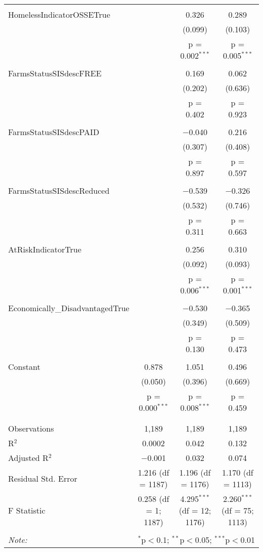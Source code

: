 \begin{table}[!htbp]
\begin{tabular}{@{\extracolsep{5pt}}lccc}
  & & & \\ 
 HomelessIndicatorOSSETrue &  & 0.326 & 0.289 \\ 
  &  & (0.099) & (0.103) \\ 
  &  & p = 0.002$^{***}$ & p = 0.005$^{***}$ \\ 
  & & & \\ 
 FarmsStatusSISdescFREE &  & 0.169 & 0.062 \\ 
  &  & (0.202) & (0.636) \\ 
  &  & p = 0.402 & p = 0.923 \\ 
  & & & \\ 
 FarmsStatusSISdescPAID &  & $-$0.040 & 0.216 \\ 
  &  & (0.307) & (0.408) \\ 
  &  & p = 0.897 & p = 0.597 \\ 
  & & & \\ 
 FarmsStatusSISdescReduced &  & $-$0.539 & $-$0.326 \\ 
  &  & (0.532) & (0.746) \\ 
  &  & p = 0.311 & p = 0.663 \\ 
  & & & \\ 
 AtRiskIndicatorTrue &  & 0.256 & 0.310 \\ 
  &  & (0.092) & (0.093) \\ 
  &  & p = 0.006$^{***}$ & p = 0.001$^{***}$ \\ 
  & & & \\ 
 Economically\_DisadvantagedTrue &  & $-$0.530 & $-$0.365 \\ 
  &  & (0.349) & (0.509) \\ 
  &  & p = 0.130 & p = 0.473 \\ 
  & & & \\ 
 Constant & 0.878 & 1.051 & 0.496 \\ 
  & (0.050) & (0.396) & (0.669) \\ 
  & p = 0.000$^{***}$ & p = 0.008$^{***}$ & p = 0.459 \\ 
  & & & \\ 
\hline \\[-1.8ex] 
Observations & 1,189 & 1,189 & 1,189 \\ 
R$^{2}$ & 0.0002 & 0.042 & 0.132 \\ 
Adjusted R$^{2}$ & $-$0.001 & 0.032 & 0.074 \\ 
Residual Std. Error & 1.216 (df = 1187) & 1.196 (df = 1176) & 1.170 (df = 1113) \\ 
F Statistic & 0.258 (df = 1; 1187) & 4.295$^{***}$ (df = 12; 1176) & 2.260$^{***}$ (df = 75; 1113) \\ 
\hline 
\hline \\[-1.8ex] 
\textit{Note:}  & \multicolumn{3}{r}{$^{*}$p$<$0.1; $^{**}$p$<$0.05; $^{***}$p$<$0.01} \\ 
\end{tabular} 
\end{table} 
